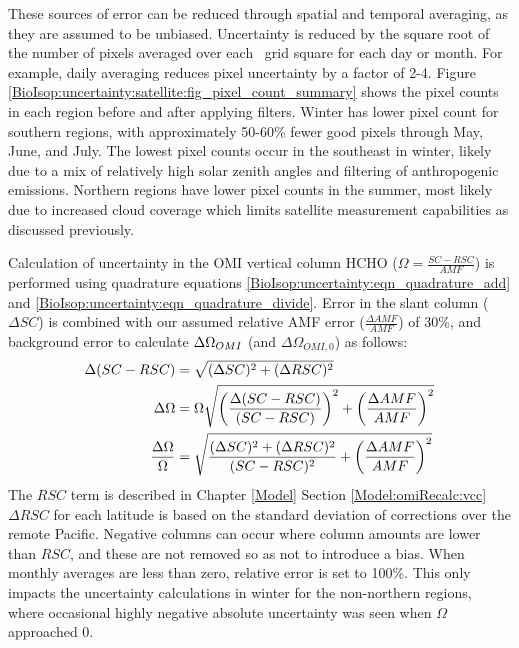     These sources of error can be reduced through spatial and temporal averaging, as they are assumed to be unbiased.
    Uncertainty is reduced by the square root of the number of pixels averaged over each \lowhr ~grid square for each day or month.
    For example, daily averaging reduces pixel uncertainty by a factor of 2-4.
    Figure \ref{BioIsop:uncertainty:satellite:fig_pixel_count_summary} shows the pixel counts in each region before and after applying filters.
    Winter has lower pixel count for southern regions, with approximately 50-60\% fewer good pixels through May, June, and July.
    The lowest pixel counts occur in the southeast in winter, likely due to a mix of relatively high solar zenith angles and filtering of anthropogenic emissions.
    Northern regions have lower pixel counts in the summer, most likely due to increased cloud coverage which limits satellite measurement capabilities as discussed previously.
    
    
    Calculation of uncertainty in the OMI vertical column HCHO ($\Omega  = \frac{SC - RSC}{AMF}$) is performed using quadrature equations \ref{BioIsop:uncertainty:eqn_quadrature_add} and \ref{BioIsop:uncertainty:eqn_quadrature_divide}.
    Error in the slant column ($\Delta SC$) is combined with our assumed relative AMF error ($\frac{\Delta AMF}{AMF}$) of 30\%, and background error to calculate $\Delta \Omega_{OMI}$ (and $\Delta \Omega_{OMI,0}$) as follows:
    \begin{align}
      \Delta (SC-RSC) & = \sqrt{(\Delta SC)^2 + (\Delta RSC)^2} \notag \\
      \Delta \Omega   & = \Omega \sqrt{ \left( \frac{\Delta (SC-RSC)}{(SC-RSC)} \right)^2 + \left( \frac{\Delta AMF}{AMF} \right)^2 } \notag \\
      \frac{\Delta \Omega}{\Omega} & = \sqrt{ \frac{ (\Delta SC)^2 + (\Delta RSC)^2}{(SC-RSC)^2} + \left( \frac{\Delta AMF}{AMF} \right)^2 } \label{BioIsop:uncertainty:satellite:eqn_VCC_uncertainty} 
    \end{align}
    The $RSC$ term is described in Chapter \ref{Model} Section \ref{Model:omiRecalc:vcc} $\Delta RSC$ for each latitude is based on the standard deviation of corrections over the remote Pacific.
    Negative columns can occur where column amounts are lower than $RSC$, and these are not removed so as not to introduce a bias.
    When monthly averages are less than zero, relative error is set to 100\%.
    This only impacts the uncertainty calculations in winter for the non-northern regions, where occasional highly negative absolute uncertainty was seen when $\Omega$ approached 0.
    
